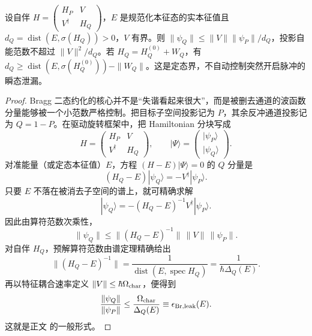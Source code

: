 \begin{lemma}[自伴分块本征态的谱隙泄漏界]
设自伴 $H=\left(\begin{smallmatrix}H_P&V\\V^\dagger&H_Q\end{smallmatrix}\right)$，$E$ 是规范化本征态的实本征值且 $d_Q=\operatorname{dist}(E,\sigma(H_Q))>0$，$V$ 有界。则 $\|\psi_Q\|\le\|V\|\|\psi_P\|/d_Q$，投影自能范数不超过 $\|V\|^2/d_Q$。若 $H_Q=H_Q^{(0)}+W_Q$，有 $d_Q\ge\operatorname{dist}(E,\sigma(H_Q^{(0)}))-\|W_Q\|$。这是定态界，不自动控制突然开启脉冲的瞬态泄漏。
\end{lemma}
\begin{proof}
Bragg 二态约化的核心并不是“失谐看起来很大”，而是被删去通道的波函数分量能够被一个小范数严格控制。把目标子空间投影记为 $P$，其余反冲通道投影记为 $Q=1-P$。在驱动旋转框架中，把 Hamiltonian 分块写成
\begin{equation*}
H=
\begin{pmatrix}
H_P & V\\
V^\dagger & H_Q
\end{pmatrix},
\qquad
|\Psi\rangle=
\begin{pmatrix}|\psi_P\rangle\\|\psi_Q\rangle\end{pmatrix}.
\end{equation*}
对准能量（或定态本征值）$E$，方程 $(H-E)|\Psi\rangle=0$ 的 $Q$ 分量是
\begin{equation*}
(H_Q-E)|\psi_Q\rangle=-V^\dagger|\psi_P\rangle.
\end{equation*}
只要 $E$ 不落在被消去子空间的谱上，就可精确求解
\begin{equation*}
|\psi_Q\rangle
=-(H_Q-E)^{-1}V^\dagger|\psi_P\rangle.
\end{equation*}
因此由算符范数次乘性，
\begin{equation*}
\|\psi_Q\|
\le
\|(H_Q-E)^{-1}\|\,\|V\|\,\|\psi_P\|.
\end{equation*}
对自伴 $H_Q$，预解算符范数由谱定理精确给出
\begin{equation*}
\|(H_Q-E)^{-1}\|
=\frac1{\operatorname{dist}(E,\operatorname{spec}H_Q)}
=\frac1{\hbar\Delta_Q(E)}.
\end{equation*}
再以特征耦合速率定义 $\|V\|\le\hbar\Omega_{\rm char}$，便得到
\begin{equation*}
\frac{\|\psi_Q\|}{\|\psi_P\|}
\le
\frac{\Omega_{\rm char}}{\Delta_Q(E)}
\equiv\epsilon_{\rm Br,leak}(E).
\end{equation*}
这就是正文 的一般形式。


\end{proof}
